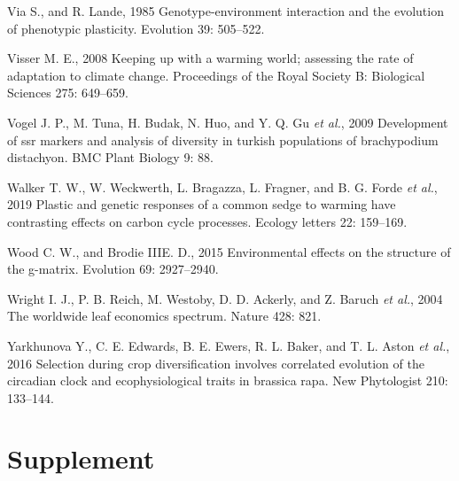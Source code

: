 \documentclass[jou,floatsintext]{apa6}
\begin{document}
\leavevmode\hypertarget{ref-via1985genotype}{}%
Via S., and R. Lande, 1985 Genotype-environment interaction and the evolution of phenotypic plasticity. Evolution 39: 505--522.

\leavevmode\hypertarget{ref-visser2008keeping}{}%
Visser M. E., 2008 Keeping up with a warming world; assessing the rate of adaptation to climate change. Proceedings of the Royal Society B: Biological Sciences 275: 649--659.

\leavevmode\hypertarget{ref-vogel2009development}{}%
Vogel J. P., M. Tuna, H. Budak, N. Huo, and Y. Q. Gu \emph{et al.}, 2009 Development of ssr markers and analysis of diversity in turkish populations of brachypodium distachyon. BMC Plant Biology 9: 88.

\leavevmode\hypertarget{ref-walker2019plastic}{}%
Walker T. W., W. Weckwerth, L. Bragazza, L. Fragner, and B. G. Forde \emph{et al.}, 2019 Plastic and genetic responses of a common sedge to warming have contrasting effects on carbon cycle processes. Ecology letters 22: 159--169.

\leavevmode\hypertarget{ref-wood2015environmental}{}%
Wood C. W., and Brodie IIIE. D., 2015 Environmental effects on the structure of the g-matrix. Evolution 69: 2927--2940.

\leavevmode\hypertarget{ref-wright2004worldwide}{}%
Wright I. J., P. B. Reich, M. Westoby, D. D. Ackerly, and Z. Baruch \emph{et al.}, 2004 The worldwide leaf economics spectrum. Nature 428: 821.

\leavevmode\hypertarget{ref-yarkhunova2016selection}{}%
Yarkhunova Y., C. E. Edwards, B. E. Ewers, R. L. Baker, and T. L. Aston \emph{et al.}, 2016 Selection during crop diversification involves correlated evolution of the circadian clock and ecophysiological traits in brassica rapa. New Phytologist 210: 133--144.

\endgroup

\newpage
\setcounter{table}{0}  \renewcommand{\thetable}{S\arabic{table}} \setcounter{figure}{0} \renewcommand{\thefigure}{S\arabic{figure}}

\hypertarget{supplement}{%
\section{Supplement}\label{supplement}}
\end{document}

